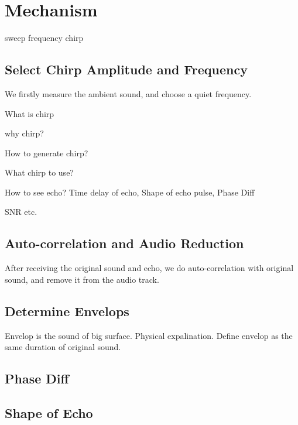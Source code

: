 \section{Mechanism}
\label{sec:mechanism}


sweep frequency chirp


\subsection{Select Chirp Amplitude and Frequency}

We firstly measure the ambient sound, and choose a quiet frequency.


What is chirp


why chirp?


How to generate chirp?


What chirp to use?


How to see echo? Time delay of echo, Shape of echo pulse, Phase Diff


SNR etc.



\subsection{Auto-correlation and Audio Reduction}

After receiving the original sound and echo, we do auto-correlation with original sound,
and remove it from the audio track.



\subsection{Determine Envelops}

Envelop is the sound of big surface. Physical expalination. 
Define envelop as the same duration of original sound.




\subsection{Phase Diff}



\subsection{Shape of Echo}



